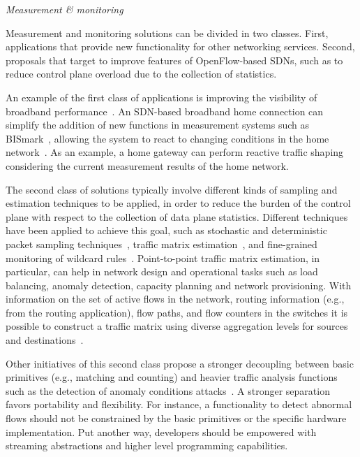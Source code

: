 \vspace{2mm}
\noindent \textit{Measurement \& monitoring}

Measurement and monitoring solutions can be divided in two classes. First, applications that provide new 
functionality for other networking services. Second, proposals that target to improve features of OpenFlow-based SDNs, 
such as to reduce control plane overload due to the collection of statistics.

An example of the first class of applications is improving the visibility of broadband 
performance~\cite{sundaresan2011,kim2013}. An SDN-based broadband home connection can 
simplify the addition of new functions in measurement systems such as BISmark~\cite{sundaresan2011}, 
allowing the system to react to changing conditions in the home network~\cite{kim2013}. As an example, a home 
gateway can perform reactive traffic shaping considering the current measurement results of the home network.

The second class of solutions typically involve different kinds of sampling and estimation 
techniques to be applied, in order to reduce the burden of the control plane with respect to the collection of data plane statistics.
Different techniques have been applied to achieve this goal, such as stochastic and deterministic packet sampling techniques~\cite{mehdi2011}, traffic matrix estimation~\cite{tootoonchian2010-1}, and fine-grained monitoring of 
wildcard rules~\cite{wette2013}.
Point-to-point traffic matrix estimation, in particular, can help in network design and operational tasks such as load balancing, anomaly detection, capacity planning and 
network provisioning.
With information on the set of active flows in the network, routing information (e.g., from the routing application), flow paths, and flow counters in the switches it is possible to 
construct a traffic matrix using diverse aggregation levels for sources and destinations~\cite{tootoonchian2010-1}.

Other initiatives of this second class propose a stronger decoupling between basic primitives (e.g., matching and counting) and 
heavier traffic analysis functions such as the detection of anomaly conditions attacks~\cite{bianchi2013}.
A stronger separation favors portability and flexibility.
For instance, a functionality to detect abnormal flows should not be constrained by the basic primitives or 
the specific hardware implementation.
Put another way, developers should be empowered with streaming 
abstractions and higher level programming capabilities.

